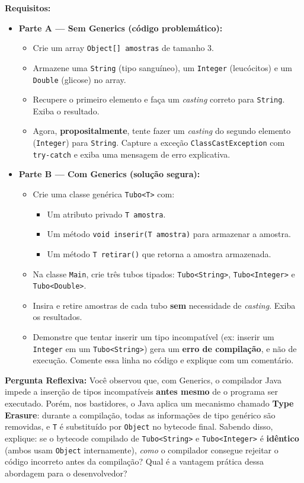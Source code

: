 \documentclass[12pt, a4paper]{article}
\begin{document}
\textbf{Requisitos:}
\begin{itemize}
    \item \textbf{Parte A — Sem Generics (código problemático):}
    \begin{itemize}
        \item Crie um array \texttt{Object[] amostras} de tamanho 3.
        \item Armazene uma \texttt{String} (tipo sanguíneo), um \texttt{Integer} (leucócitos) e um \texttt{Double} (glicose) no array.
        \item Recupere o primeiro elemento e faça um \textit{casting} correto para \texttt{String}. Exiba o resultado.
        \item Agora, \textbf{propositalmente}, tente fazer um \textit{casting} do segundo elemento (\texttt{Integer}) para \texttt{String}. Capture a exceção \texttt{ClassCastException} com \texttt{try-catch} e exiba uma mensagem de erro explicativa.
    \end{itemize}
    \item \textbf{Parte B — Com Generics (solução segura):}
    \begin{itemize}
        \item Crie uma classe genérica \texttt{Tubo<T>} com:
        \begin{itemize}
            \item Um atributo privado \texttt{T amostra}.
            \item Um método \texttt{void inserir(T amostra)} para armazenar a amostra.
            \item Um método \texttt{T retirar()} que retorna a amostra armazenada.
        \end{itemize}
        \item Na classe \texttt{Main}, crie três tubos tipados: \texttt{Tubo<String>}, \texttt{Tubo<Integer>} e \texttt{Tubo<Double>}.
        \item Insira e retire amostras de cada tubo \textbf{sem} necessidade de \textit{casting}. Exiba os resultados.
        \item Demonstre que tentar inserir um tipo incompatível (ex: inserir um \texttt{Integer} em um \texttt{Tubo<String>}) gera um \textbf{erro de compilação}, e não de execução. Comente essa linha no código e explique com um comentário.
    \end{itemize}
\end{itemize}

\textbf{Pergunta Reflexiva:} Você observou que, com Generics, o compilador Java impede a inserção de tipos incompatíveis \textbf{antes mesmo} de o programa ser executado. Porém, nos bastidores, o Java aplica um mecanismo chamado \textbf{Type Erasure}: durante a compilação, todas as informações de tipo genérico são removidas, e \texttt{T} é substituído por \texttt{Object} no bytecode final. Sabendo disso, explique: se o bytecode compilado de \texttt{Tubo<String>} e \texttt{Tubo<Integer>} é \textbf{idêntico} (ambos usam \texttt{Object} internamente), \textit{como} o compilador consegue rejeitar o código incorreto antes da compilação? Qual é a vantagem prática dessa abordagem para o desenvolvedor?
\end{document}
